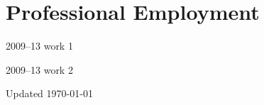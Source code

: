 \documentclass[12pt,letterpaper]{report}
\begin{document}
    \section*{Professional Employment}

    \begin{tablist}

        \item[2009--13] \tab{}work 1
        \item[2009--13] \tab{}work 2

    \end{tablist}



    \begin{center}
        \vfill
        Updated \monthyeardate\today
    \end{center}
\end{document}
